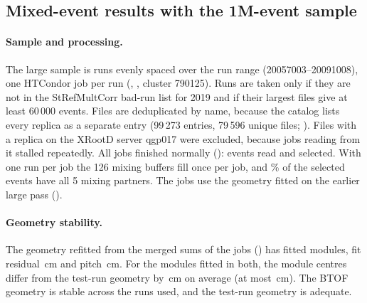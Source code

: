 \subsection{Mixed-event results with the 1M-event sample}
\label{sec:me1m}

\paragraph{Sample and processing.} The large sample is \meNRunsVthree{} runs evenly spaced over the run range
(20057003--20091008), one HTCondor job per run (, ,
cluster 790125). Runs are taken only if they are not in the StRefMultCorr bad-run list for 2019 and if their
largest files give at least 60\,000 events. Files are deduplicated by name, because the catalog lists every
replica as a separate entry (99\,273 entries, 79\,596 unique files; ). Files
with a replica on the XRootD server qgp017 were excluded, because jobs reading from it stalled repeatedly.
All \meNJobsVthree{} jobs finished normally (): \meEvtAllVthree{} events read and
\meEvtSelVthree{} selected. With one run per job the 126 mixing buffers fill once per job, and
\meFracFullMixVthree\% of the selected events have all 5 mixing partners.
The jobs use the geometry fitted on the earlier large pass ().



\paragraph{Geometry stability.} The geometry refitted from the merged sums of the \meNJobsVthree{} jobs
() has \geoNFitVthree{} fitted modules, fit residual \geoFitRmsVthree\,cm and pitch
\geoPitchAbsVthree\,cm. For the \geoCmpNVthree{} modules fitted in both, the module centres differ from the
test-run geometry by \geoCmpMeanVthree\,cm on average (at most \geoCmpMaxVthree\,cm).
The BTOF geometry is stable across the runs used, and the test-run geometry is adequate.

